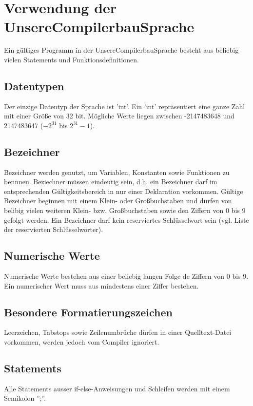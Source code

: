 
\section{Verwendung der UnsereCompilerbauSprache}
Ein gültiges Programm in der UnsereCompilerbauSprache besteht aus beliebig vielen Statements und Funktionsdefinitionen. 

\subsection{Datentypen}
Der einzige Datentyp der Sprache ist 'int'. Ein 'int' repräsentiert eine ganze Zahl mit einer Größe von 32 bit. Mögliche Werte liegen zwischen -2147483648 und 2147483647 ($-2^{31}$ bis $2^{31} - 1$).

\subsection{Bezeichner}
Bezeichner werden genutzt, um Variablen, Konstanten sowie Funktionen zu bennnen.
Beziechner müssen eindeutig sein, d.h. ein Bezeichner darf im entsprechenden Gültigkeitsbereich in nur einer Deklaration vorkommen. Gültige Bezeichner beginnen mit einem Klein- oder Großbuchstaben und dürfen von belibig vielen weiteren Klein- bzw. Großbuchstaben sowie den Ziffern von 0 bis 9 gefolgt werden. Ein Bezeichner darf kein reserviertes Schlüsselwort sein (vgl. Liste der reservierten Schlüsselwörter).

\subsection{Numerische Werte}
Numerische Werte bestehen aus einer beliebig langen Folge de Ziffern von 0 bis 9. Ein numerischer Wert muss aus mindestens einer Ziffer bestehen.

\subsection{Besondere Formatierungszeichen} 
Leerzeichen, Tabstops sowie Zeilenumbrüche dürfen in einer Quelltext-Datei vorkommen, werden jedoch vom Compiler ignoriert.


\subsection{Statements}
Alle Statements ausser if-else-Anweisungen und Schleifen werden mit einem Semikolon '';''.

